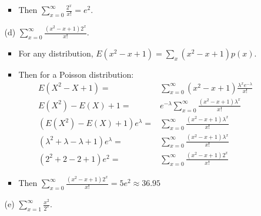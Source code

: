 \documentclass{article}
\begin{document}
\begin{enumerate}
\begin{enumerate}
\begin{itemize}
        \item Then $\sum_{x=0}^{\infty} \frac{2^x}{x!} = e^2$.
        \end{itemize}
    \item [(d)] $\sum_{x=0}^{\infty}\frac{(x^2-x+1)2^x}{x!}$.
        \begin{itemize}
        \item For any distribution, $E(x^2 - x + 1) = \sum_{x} (x^2 - x + 1)p(x)$.
        \item Then for a Poisson distribution:
        \begin{equation*}
        \begin{aligned}
            E(X^2 - X + 1) =& \sum_{x=0}^{\infty} (x^2 - x + 1) \frac{\lambda^x e^{-\lambda}}{x!} \\
            E(X^2) - E(X) + 1 =& e^{-\lambda} \sum_{x=0}^{\infty} \frac{(x^2 - x + 1) \lambda^x}{x!} \\
            (E(X^2) - E(X) + 1)e^{\lambda} =&  \sum_{x=0}^{\infty} \frac{(x^2 - x + 1) \lambda^x}{x!} \\
            (\lambda^2 + \lambda - \lambda + 1)e^{\lambda} =& \sum_{x=0}^{\infty} \frac{(x^2 - x + 1) \lambda^x}{x!} \\
            (2^2 + 2 - 2 + 1)e^2 =& \sum_{x=0}^{\infty} \frac{(x^2 - x + 1) 2^x}{x!}
        \end{aligned}
        \end{equation*}
        \item Then $\sum_{x=0}^{\infty}\frac{(x^2-x+1)2^x}{x!} = 5e^2 \approx 36.95$
        \end{itemize}
    \item [(e)] $\sum_{x=1}^{\infty}\frac{x^2}{2^x}$.
    \end{enumerate}
\end{enumerate}
\end{document}
